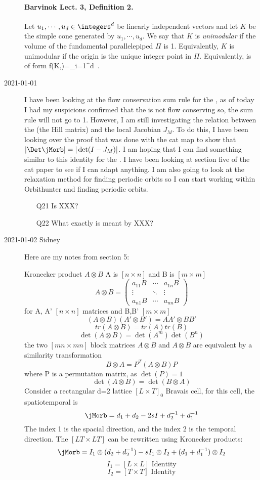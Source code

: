 \begin{description}
\paragraph{Barvinok Lect. 3, Definition 2.}
Let $u_1,\cdots,u_d\in\integers^d$ be linearly independent vectors and let
$K$ be the simple cone generated by $u_1,\cdots,u_d$. We say that $K$ is
\emph{unimodular} if the volume of the fundamental parallelepiped $\Pi$
is 1. Equivalently, $K$ is {unimodular} if the origin is the unique integer
point in $\Pi$. Equivalently,  is of form
\beq
f(K,)=\prod_{i=1}^d
\,.

\item[2021-01-01]
I have been looking at the flow conservation sum rule for the {\HenonMap},
as of today I had my suspicions confirmed that the {\HenonMap} is not flow
conserving so, the sum rule will not go to 1. However, I am still
investigating the relation between the {\jacobianOrb} (the Hill
matrix) and the local Jacobian $J_M$. To do this, I have been looking
over the proof that was done with the cat map to show that
$|\Det\jMorb|=|\det(I-J_M)|$. I am hoping that I can find something
similar to this identity for the {\HenonMap}. I have been looking at
section five of the cat paper to see if I can adapt anything.
I am also going to look at the relaxation method for
finding periodic orbits so I can start working within Orbithunter and
finding periodic orbits.
    \begin{itemize}
        \item[Q21]
Is XXX?
        \item[Q22]
What exactly is meant by XXX?
    \end{itemize}


\item[2021-01-02 Sidney]

Here are my notes from section 5:

Kronecker product $A\otimes B$ A is $[n\times{n}]$ and B is $[m\times{m}]$
$$A\otimes B=
\begin{pmatrix}
a_{11}B & \cdots & a_{1n}B\\
\vdots & \ddots & \vdots\\
a_{n1}B & \cdots & a_{nn}B
\end{pmatrix}
$$
for A, A' $[n\times{n}]$ matrices and B,B' $[m\times{m}]$
$$\left(A\otimes B\right)\left(A'\otimes B'\right)=AA'\otimes BB'$$
$$tr(A\otimes B)=tr(A)tr(B)$$
$$\det(A\otimes B)=\det(A^m)\det(B^n)$$
the two $[mn\times{m}n]$ block matrices $A\otimes B$ and $A\otimes B$ are
equivalent by a similarity transformation
$$B\otimes A=P^T(A\otimes B)P$$
where P is a permutation matrix, as $\det(P)=1$
$$\det(A\otimes B)=\det(B\otimes A)$$
Consider a rectangular d=2 lattice $[L\times{T}]_0$ Bravais cell, for this cell, the spatiotemporal {\jacobianOrb} is
$$\jMorb=\shift_1+\shift_2-2sI+\shift_2^{-1}+\shift_1^{-1}$$
The index 1 is the spacial direction, and the index 2 is the temporal
direction. The $[LT\times{L}T]$ {\jacobianOrb} can be rewritten using Kronecker
products:
$$\jMorb=I_1\otimes(\shift_2+\shift_2^{-1})-sI_1\otimes I_2+(\shift_1+\shift_1^{-1})\otimes I_2$$
$$I_1=[L\times{L}]\text{ Identity}$$
$$I_2=[T\times{T}]\text{ Identity}$$


\end{description}

